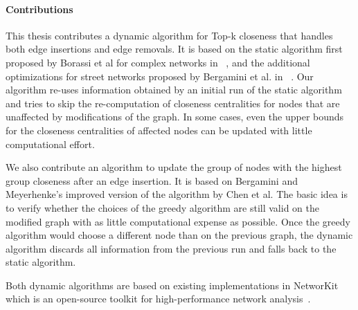 \paragraph{Contributions}
This thesis contributes a dynamic algorithm for Top-k closeness that handles both edge insertions and edge removals. It is based on the static algorithm first proposed by Borassi et al for complex networks in ~\cite{borassi2015fast}, and the additional optimizations for street networks proposed by Bergamini et al. in ~\cite{bergamini2016computing}. Our algorithm re-uses information obtained by an initial run of the static algorithm and tries to skip the re-computation of closeness centralities for nodes that are unaffected by modifications of the graph. In some cases, even the upper bounds for the closeness centralities of affected nodes can be updated with little computational effort.

We also contribute an algorithm to update the group of nodes with the highest group closeness after an edge insertion. It is based on Bergamini and Meyerhenke's improved version of the algorithm by Chen et al. The basic idea is to verify whether the choices of the greedy algorithm are still valid on the modified graph with as little computational expense as possible. Once the greedy algorithm would choose a different node than on the previous graph, the dynamic algorithm discards all information from the previous run and falls back to the static algorithm.

Both dynamic algorithms are based on existing implementations in NetworKit which is an open-source toolkit for high-performance network analysis~\cite{staudt2014networkit}.